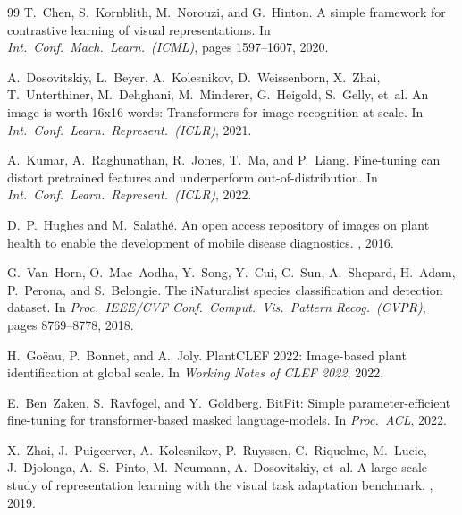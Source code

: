\documentclass[10pt,twocolumn,letterpaper]{article}
\begin{document}
\begin{thebibliography}{99}
T.~Chen, S.~Kornblith, M.~Norouzi, and G.~Hinton.
\newblock A simple framework for contrastive learning of visual representations.
\newblock In {\em Int.\ Conf.\ Mach.\ Learn.\ (ICML)}, pages 1597--1607, 2020.

A.~Dosovitskiy, L.~Beyer, A.~Kolesnikov, D.~Weissenborn,
X.~Zhai, T.~Unterthiner, M.~Dehghani, M.~Minderer, G.~Heigold,
S.~Gelly, et~al.
\newblock An image is worth 16x16 words: Transformers for image
  recognition at scale.
\newblock In {\em Int.\ Conf.\ Learn.\ Represent.\ (ICLR)}, 2021.

A.~Kumar, A.~Raghunathan, R.~Jones, T.~Ma, and P.~Liang.
\newblock Fine-tuning can distort pretrained features and underperform
  out-of-distribution.
\newblock In {\em Int.\ Conf.\ Learn.\ Represent.\ (ICLR)}, 2022.

D.~P.~Hughes and M.~Salath\'e.
\newblock An open access repository of images on plant health to enable
  the development of mobile disease diagnostics.
, 2016.

G.~Van~Horn, O.~Mac~Aodha, Y.~Song, Y.~Cui, C.~Sun, A.~Shepard,
H.~Adam, P.~Perona, and S.~Belongie.
\newblock The iNaturalist species classification and detection dataset.
\newblock In {\em Proc.\ IEEE/CVF Conf.\ Comput.\ Vis.\ Pattern
  Recog.\ (CVPR)}, pages 8769--8778, 2018.

H.~Go\"eau, P.~Bonnet, and A.~Joly.
\newblock PlantCLEF 2022: Image-based plant identification at global scale.
\newblock In {\em Working Notes of CLEF 2022}, 2022.

E.~Ben~Zaken, S.~Ravfogel, and Y.~Goldberg.
\newblock BitFit: Simple parameter-efficient fine-tuning for
  transformer-based masked language-models.
\newblock In {\em Proc.\ ACL}, 2022.

X.~Zhai, J.~Puigcerver, A.~Kolesnikov, P.~Ruyssen, C.~Riquelme,
M.~Lucic, J.~Djolonga, A.~S.~Pinto, M.~Neumann, A.~Dosovitskiy,
et~al.
\newblock A large-scale study of representation learning with the
  visual task adaptation benchmark.
, 2019.

\end{thebibliography}
\end{document}
